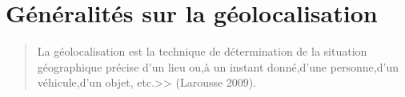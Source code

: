 \section{Généralités sur la géolocalisation}
	    \begin{quotation}
		La géolocalisation est la technique de détermination  de la situation géographique précise  d'un lieu ou,à un instant
		donné,d'une personne,d'un véhicule,d'un objet, etc.>> (Larousse 2009).
	    \end{quotation}
 
		